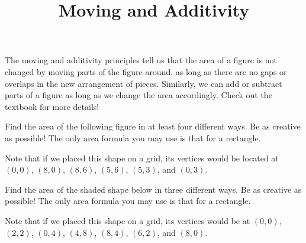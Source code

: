 \documentclass[noauthor,nooutcomes]{ximera}
\begin{document}
\title{Moving and Additivity}
\begin{abstract}
\end{abstract}
\maketitle

The moving and additivity principles tell us that the area of a figure is not changed by moving parts of the figure around, as long as there are no gaps or overlaps in the new arrangement of pieces.  Similarly, we can add or subtract parts of a figure as long as we change the area accordingly.  Check out the textbook for more details!

\begin{problem}
Find the area of the following figure in at least four different ways.  Be as creative as possible!  The only area formula you may use is that for a rectangle.

Note that if we placed this shape on a grid, its vertices would be located at $(0,0)$, $(8,0)$, $(8,6)$, $(5,6)$, $(5,3)$, and $(0,3)$.
\begin{center}
\end{center}
\end{problem}



\pagebreak

\begin{problem}
Find the area of the shaded shape below in three different ways.  Be as creative as possible!  The only area formula you may use is that for a rectangle.

Note that if we placed this shape on a grid, its vertices would be at $(0,0)$, $(2,2)$, $(0,4)$, $(4,8)$, $(8,4)$, $(6,2)$, and $(8,0)$.

\begin{center}
\end{center}
\end{problem}
\end{document}
